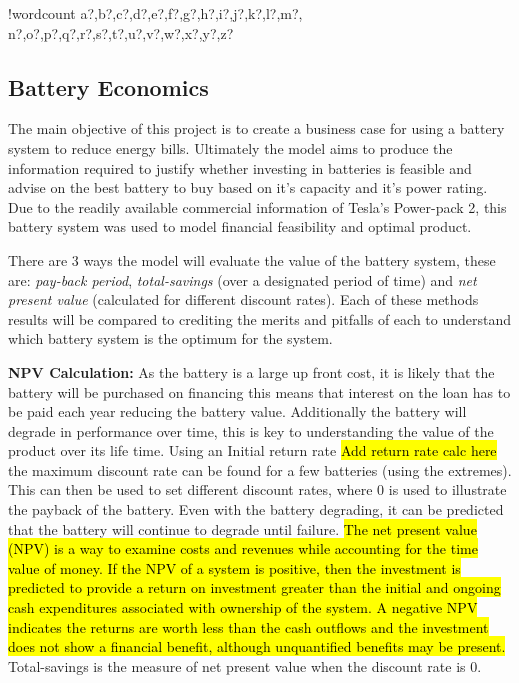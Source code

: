 \documentclass[fontsize=9.5pt]{extarticle}
\numberwithin{figure}{section} %
\newcounter{words}
\newenvironment{counted}{%
  \setcounter{words}{0}
  \SearchList!{wordcount}{\stepcounter{words}}
    {a?,b?,c?,d?,e?,f?,g?,h?,i?,j?,k?,l?,m?,
    n?,o?,p?,q?,r?,s?,t?,u?,v?,w?,x?,y?,z?}
  \UndoBoundary{'}
  \SearchOrder{p;}}{%
  \StopSearching}
\begin{document}
\begin{counted}
\subsection{Battery Economics}\label{battery-economics}

The main objective of this project is to create a business case for
using a battery system to reduce energy bills. Ultimately the model aims
to produce the information required to justify whether investing in
batteries is feasible and advise on the best battery to buy based on
it's capacity and it's power rating. Due to the readily available
commercial information of Tesla's Power-pack 2, this battery system was
used to model financial feasibility and optimal product.

There are 3 ways the model will evaluate the value of the battery
system, these are: \emph{pay-back period}, \emph{total-savings} (over a
designated period of time) and \emph{net present value} (calculated for
different discount rates). Each of these methods results will be
compared to crediting the merits and pitfalls of each to understand
which battery system is the optimum for the system.

\textbf{NPV Calculation:} As the battery is a large up front cost, it is
likely that the battery will be purchased on financing this means that
interest on the loan has to be paid each year reducing the battery
value. Additionally the battery will degrade in performance over time,
this is key to understanding the value of the product over its life
time. Using an Initial return rate \hl{Add return rate calc here} the
maximum discount rate can be found for a few batteries (using the
extremes). This can then be used to set different discount rates, where
0 is used to illustrate the payback of the battery. Even with the
battery degrading, it can be predicted that the battery will continue to
degrade until failure.
\hl{The net present value (NPV) is a way to examine costs and revenues while accounting for the time value of money. If the NPV of a system is positive, then the investment is predicted to provide a return on investment greater than the initial and ongoing cash expenditures associated with ownership of the system. A negative NPV indicates the returns are worth less than the cash outflows and the investment does not show a financial benefit, although unquantified benefits may be present.}
\cite{diorio2015economic} Total-savings is the measure of net present
value when the discount rate is 0.


\end{counted}
\end{document}

